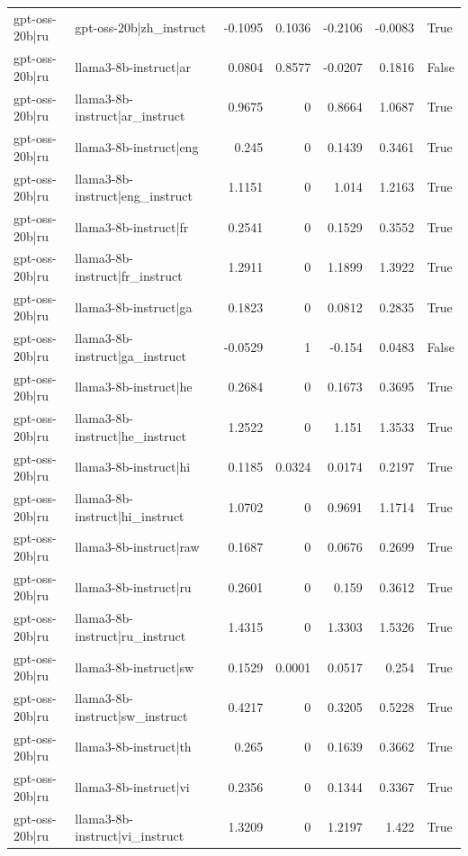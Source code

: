 \begin{table}
\begin{tabular}{l l r r r r l}
gpt-oss-20b|ru & gpt-oss-20b|zh_instruct & -0.1095 & 0.1036 & -0.2106 & -0.0083 & True \\
gpt-oss-20b|ru & llama3-8b-instruct|ar & 0.0804 & 0.8577 & -0.0207 & 0.1816 & False \\
gpt-oss-20b|ru & llama3-8b-instruct|ar_instruct & 0.9675 & 0 & 0.8664 & 1.0687 & True \\
gpt-oss-20b|ru & llama3-8b-instruct|eng & 0.245 & 0 & 0.1439 & 0.3461 & True \\
gpt-oss-20b|ru & llama3-8b-instruct|eng_instruct & 1.1151 & 0 & 1.014 & 1.2163 & True \\
gpt-oss-20b|ru & llama3-8b-instruct|fr & 0.2541 & 0 & 0.1529 & 0.3552 & True \\
gpt-oss-20b|ru & llama3-8b-instruct|fr_instruct & 1.2911 & 0 & 1.1899 & 1.3922 & True \\
gpt-oss-20b|ru & llama3-8b-instruct|ga & 0.1823 & 0 & 0.0812 & 0.2835 & True \\
gpt-oss-20b|ru & llama3-8b-instruct|ga_instruct & -0.0529 & 1 & -0.154 & 0.0483 & False \\
gpt-oss-20b|ru & llama3-8b-instruct|he & 0.2684 & 0 & 0.1673 & 0.3695 & True \\
gpt-oss-20b|ru & llama3-8b-instruct|he_instruct & 1.2522 & 0 & 1.151 & 1.3533 & True \\
gpt-oss-20b|ru & llama3-8b-instruct|hi & 0.1185 & 0.0324 & 0.0174 & 0.2197 & True \\
gpt-oss-20b|ru & llama3-8b-instruct|hi_instruct & 1.0702 & 0 & 0.9691 & 1.1714 & True \\
gpt-oss-20b|ru & llama3-8b-instruct|raw & 0.1687 & 0 & 0.0676 & 0.2699 & True \\
gpt-oss-20b|ru & llama3-8b-instruct|ru & 0.2601 & 0 & 0.159 & 0.3612 & True \\
gpt-oss-20b|ru & llama3-8b-instruct|ru_instruct & 1.4315 & 0 & 1.3303 & 1.5326 & True \\
gpt-oss-20b|ru & llama3-8b-instruct|sw & 0.1529 & 0.0001 & 0.0517 & 0.254 & True \\
gpt-oss-20b|ru & llama3-8b-instruct|sw_instruct & 0.4217 & 0 & 0.3205 & 0.5228 & True \\
gpt-oss-20b|ru & llama3-8b-instruct|th & 0.265 & 0 & 0.1639 & 0.3662 & True \\
gpt-oss-20b|ru & llama3-8b-instruct|vi & 0.2356 & 0 & 0.1344 & 0.3367 & True \\
gpt-oss-20b|ru & llama3-8b-instruct|vi_instruct & 1.3209 & 0 & 1.2197 & 1.422 & True \\

\end{tabular}
\end{table}
